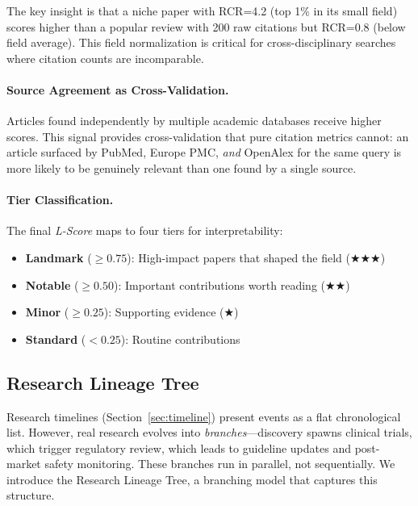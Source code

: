 \documentclass[11pt,a4paper]{article}
\newcommand{\lscore}{\textit{L-Score}}
\begin{document}
The key insight is that a niche paper with RCR=4.2 (top 1\% in its small field) scores higher than a popular review with 200 raw citations but RCR=0.8 (below field average).
This field normalization is critical for cross-disciplinary searches where citation counts are incomparable.

\paragraph{Source Agreement as Cross-Validation.}
Articles found independently by multiple academic databases receive higher scores.
This signal provides cross-validation that pure citation metrics cannot: an article surfaced by PubMed, Europe PMC, \emph{and} OpenAlex for the same query is more likely to be genuinely relevant than one found by a single source.

\paragraph{Tier Classification.}
The final \lscore{} maps to four tiers for interpretability:
\begin{itemize}
    \item \textbf{Landmark} ($\geq 0.75$): High-impact papers that shaped the field ($\bigstar\bigstar\bigstar$)
    \item \textbf{Notable} ($\geq 0.50$): Important contributions worth reading ($\bigstar\bigstar$)
    \item \textbf{Minor} ($\geq 0.25$): Supporting evidence ($\bigstar$)
    \item \textbf{Standard} ($< 0.25$): Routine contributions
\end{itemize}

\subsection{Research Lineage Tree}
\label{sec:lineage_tree}

Research timelines (Section~\ref{sec:timeline}) present events as a flat chronological list.
However, real research evolves into \emph{branches}---discovery spawns clinical trials, which trigger regulatory review, which leads to guideline updates and post-market safety monitoring.
These branches run in parallel, not sequentially.
We introduce the Research Lineage Tree, a branching model that captures this structure.
\end{document}
